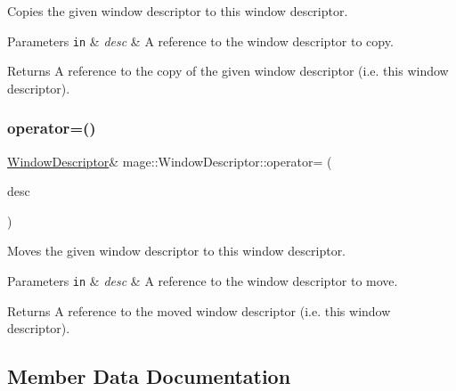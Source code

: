 Copies the given window descriptor to this window descriptor.


\begin{DoxyParams}[1]{Parameters}
\mbox{\tt in}  & {\em desc} & A reference to the window descriptor to copy. \\
\hline
\end{DoxyParams}
\begin{DoxyReturn}{Returns}
A reference to the copy of the given window descriptor (i.\+e. this window descriptor). 
\end{DoxyReturn}
\hypertarget{classmage_1_1_window_descriptor_a314e45a7cac3a68caefd8b05ddc86040}{}\label{classmage_1_1_window_descriptor_a314e45a7cac3a68caefd8b05ddc86040} 
\subsubsection{\texorpdfstring{operator=()}{operator=()}\hspace{0.1cm}{\footnotesize\ttfamily [2/2]}}
{\footnotesize\ttfamily \hyperlink{classmage_1_1_window_descriptor}{Window\+Descriptor}\& mage\+::\+Window\+Descriptor\+::operator= (\begin{DoxyParamCaption}\item[{\hyperlink{classmage_1_1_window_descriptor}{Window\+Descriptor} \&\&}]{desc }\end{DoxyParamCaption})\hspace{0.3cm}{\ttfamily [delete]}}

Moves the given window descriptor to this window descriptor.


\begin{DoxyParams}[1]{Parameters}
\mbox{\tt in}  & {\em desc} & A reference to the window descriptor to move. \\
\hline
\end{DoxyParams}
\begin{DoxyReturn}{Returns}
A reference to the moved window descriptor (i.\+e. this window descriptor). 
\end{DoxyReturn}


\subsection{Member Data Documentation}
\hypertarget{classmage_1_1_window_descriptor_afa7ab62493d51db5d1ab6a4167f2da4a}{}\label{classmage_1_1_window_descriptor_afa7ab62493d51db5d1ab6a4167f2da4a} 
